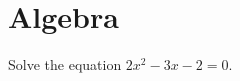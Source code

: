 \documentclass{article}
\begin{document}
\section{Algebra}
\begin{problem}
Solve the equation $2x^2-3x-2=0$.
\end{problem}
\end{document}
